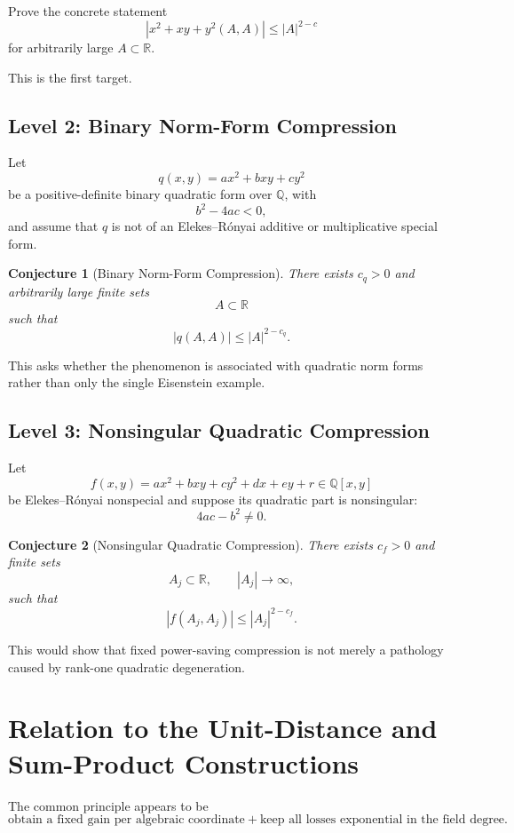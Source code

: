 \documentclass[11pt]{article}
\newtheorem{conjecture}{Conjecture}
\begin{document}
Prove the concrete statement
\[
\boxed{
|x^2+xy+y^2(A,A)|\le |A|^{2-c}
}
\]
for arbitrarily large \(A\subset\mathbb R\).

This is the first target.

\subsection{Level 2: Binary Norm-Form Compression}

Let
\[
q(x,y)=ax^2+bxy+cy^2
\]
be a positive-definite binary quadratic form over \(\mathbb Q\), with
\[
b^2-4ac<0,
\]
and assume that \(q\) is not of an Elekes--R\'onyai additive or multiplicative special form.

\begin{conjecture}[Binary Norm-Form Compression]
There exists \(c_q>0\) and arbitrarily large finite sets
\[
A\subset\mathbb R
\]
such that
\[
\boxed{
|q(A,A)|\le |A|^{2-c_q}.
}
\]
\end{conjecture}

This asks whether the phenomenon is associated with quadratic norm forms rather than only the single Eisenstein example.

\subsection{Level 3: Nonsingular Quadratic Compression}

Let
\[
f(x,y)=ax^2+bxy+cy^2+dx+ey+r\in\mathbb Q[x,y]
\]
be Elekes--R\'onyai nonspecial and suppose its quadratic part is nonsingular:
\[
\boxed{4ac-b^2\neq0.}
\]

\begin{conjecture}[Nonsingular Quadratic Compression]
There exists \(c_f>0\) and finite sets
\[
A_j\subset\mathbb R,
\qquad
|A_j|\to\infty,
\]
such that
\[
\boxed{
|f(A_j,A_j)|\le |A_j|^{2-c_f}.
}
\]
\end{conjecture}

This would show that fixed power-saving compression is not merely a pathology caused by rank-one quadratic degeneration.

\section{Relation to the Unit-Distance and Sum-Product Constructions}

The common principle appears to be
\[
\boxed{
\text{obtain a fixed gain per algebraic coordinate}
+
\text{keep all losses exponential in the field degree}.
}
\]
\end{document}
